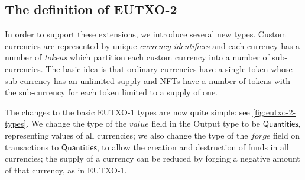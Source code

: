 \documentclass[a4paper]{article}
\newcommand{\s}{\textsf}  %
\newcommand{\mi}[1]{\ensuremath{\mathit{#1}}}
\newcommand{\forge}{\mi{forge}}
\newcommand{\val}{\mi{value}}  %
\newcommand{\qtymap}{\ensuremath{\s{Quantities}}}
\begin{document}
\subsection{The definition of EUTXO-2}
In order to support these extensions, we introduce several new types.
Custom currencies are represented by unique \textit{currency
  identifiers} and each currency has a number of \textit{tokens} which
partition each custom currency into a number of sub-currencies.  The
basic idea is that ordinary currencies have a single token whose
sub-currency has an unlimited supply and NFTs have a number of tokens
with the sub-currency for each token limited to a supply of one.

The changes to the basic EUTXO-1 types are now quite simple:
see \cref{fig:eutxo-2-types}.  We change the type of the $\val$ field
in the \s{Output} type to be \qtymap{}, representing values of all currencies;
we also change the type of the \forge{} field on transactions to \qtymap{}, to
allow the creation and destruction of funds in all currencies; the
supply of a currency can be reduced by forging a negative amount of that
currency, as in EUTXO-1.
\end{document}
